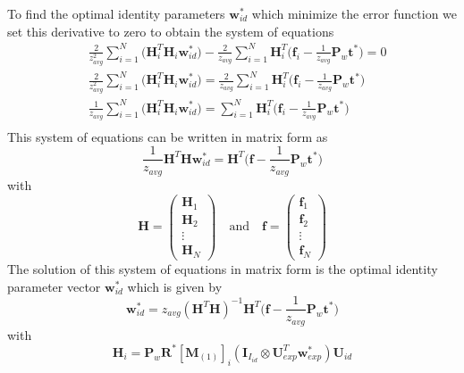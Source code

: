\documentclass[11pt,a4paper]{report}
\begin{document}
To find the optimal identity parameters $\mathbf{w}_{id}^*$ which minimize the error function we set
this derivative to zero to obtain the system of equations 
\begin{align*}
&\frac{2}{z_{avg}^2}\sum_{i=1}^N\bigl(
\mathbf{H}_i^T\mathbf{H}_i\mathbf{w}^*_{id}\bigr)
-
\frac{2}{z_{avg}}\sum_{i=1}^N \mathbf{H}_i^T\bigl(\mathbf{f}_i -
\frac{1}{z_{avg}}\mathbf{P}_w\mathbf{t}^*\bigr) = 0\\
&\frac{2}{z_{avg}^2}\sum_{i=1}^N\bigl(
\mathbf{H}_i^T\mathbf{H}_i\mathbf{w}^*_{id}\bigr)
=
\frac{2}{z_{avg}}\sum_{i=1}^N \mathbf{H}_i^T\bigl(\mathbf{f}_i -
\frac{1}{z_{avg}}\mathbf{P}_w\mathbf{t}^*\bigr)\\
&\frac{1}{z_{avg}}\sum_{i=1}^N\bigl(
\mathbf{H}_i^T\mathbf{H}_i\mathbf{w}^*_{id}\bigr)
=
\sum_{i=1}^N \mathbf{H}_i^T\bigl(\mathbf{f}_i -
\frac{1}{z_{avg}}\mathbf{P}_w\mathbf{t}^*\bigr)\\
\end{align*}
This system of equations can be written in matrix form as
\begin{equation}
\frac{1}{z_{avg}}\mathbf{H}^T\mathbf{H}\mathbf{w}^*_{id} =
\mathbf{H}^T\bigl(\mathbf{f} - \frac{1}{z_{avg}}\mathbf{P}_w\mathbf{t}^*\bigr)
\end{equation}
with
\begin{equation}
\mathbf{H} = 
\begin{pmatrix}
\mathbf{H}_1\\
\mathbf{H}_2\\
\vdots\\
\mathbf{H}_N
\end{pmatrix}
\quad \mathrm{and} \quad 
\mathbf{f} = 
\begin{pmatrix}
\mathbf{f}_1\\
\mathbf{f}_2\\
\vdots\\
\mathbf{f}_N
\end{pmatrix}
\end{equation}
The solution of this system of equations in matrix form is the optimal identity parameter
vector $\mathbf{w}^*_{id}$ which is given by
\begin{equation}\label{eq:nonlin1}
\mathbf{w}^*_{id} = z_{avg}(\mathbf{H}^T\mathbf{H})^{-1}\mathbf{H}^T\bigl(\mathbf{f} - \frac{1}{z_{avg}}\mathbf{P}_w\mathbf{t}^*\bigr)
\end{equation}
with
\begin{equation}\label{eq:H}
\mathbf{H}_i = \mathbf{P}_w\mathbf{R}^*[\mathbf{M}_{(1)}]_{i}(\mathbf{I}_{I_{id}}
\otimes \mathbf{U}_{exp}^T\mathbf{w}^*_{exp})\mathbf{U}_{id}
\end{equation}
\end{document}
